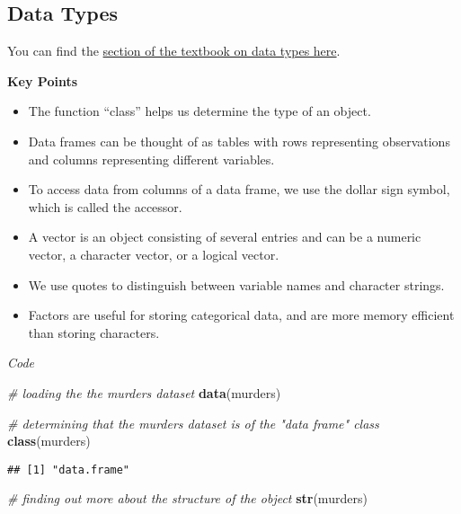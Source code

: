 \documentclass[
]{article}
\newenvironment{Shaded}{\begin{snugshade}}{\end{snugshade}}
\newcommand{\CommentTok}[1]{\textcolor[rgb]{0.56,0.35,0.01}{\textit{#1}}}
\newcommand{\KeywordTok}[1]{\textcolor[rgb]{0.13,0.29,0.53}{\textbf{#1}}}
\newcommand{\NormalTok}[1]{#1}
\providecommand{\tightlist}{%
  \setlength{\itemsep}{0pt}\setlength{\parskip}{0pt}}
\begin{document}
\hypertarget{data-types}{%
\subsection{Data Types}\label{data-types}}

You can find the
\href{https://rafalab.github.io/dsbook/r-basics.html\#data-types}{section
of the textbook on data types here}.

\textbf{Key Points}

\begin{itemize}
\tightlist
\item
  The function ``class'' helps us determine the type of an object.
\item
  Data frames can be thought of as tables with rows representing
  observations and columns representing different variables.
\item
  To access data from columns of a data frame, we use the dollar sign
  symbol, which is called the accessor.
\item
  A vector is an object consisting of several entries and can be a
  numeric vector, a character vector, or a logical vector.
\item
  We use quotes to distinguish between variable names and character
  strings.
\item
  Factors are useful for storing categorical data, and are more memory
  efficient than storing characters.
\end{itemize}

\emph{Code}

\begin{Shaded}
\begin{Highlighting}[]
\CommentTok{# loading the the murders dataset}
\KeywordTok{data}\NormalTok{(murders)}

\CommentTok{# determining that the murders dataset is of the "data frame" class}
\KeywordTok{class}\NormalTok{(murders)}
\end{Highlighting}
\end{Shaded}

\begin{verbatim}
## [1] "data.frame"
\end{verbatim}

\begin{Shaded}
\begin{Highlighting}[]
\CommentTok{# finding out more about the structure of the object}
\KeywordTok{str}\NormalTok{(murders)}
\end{Highlighting}
\end{Shaded}
\end{document}
